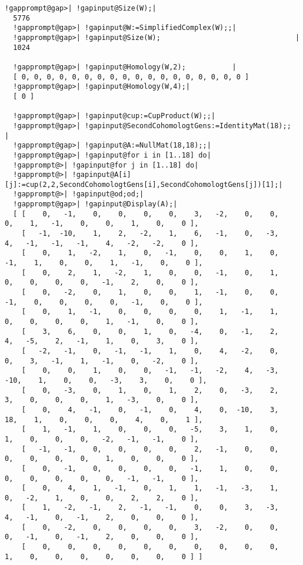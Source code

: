 \documentclass[a4paper,11pt]{report}
\begin{document}
{{\begin{Verbatim}[commandchars=!@|,fontsize=\small,frame=single,label=Example]
  !gapprompt@gap>| !gapinput@Size(W);|
  5776
  !gapprompt@gap>| !gapinput@W:=SimplifiedComplex(W);;|
  !gapprompt@gap>| !gapinput@Size(W);                                |
  1024
  
  !gapprompt@gap>| !gapinput@Homology(W,2);           |
  [ 0, 0, 0, 0, 0, 0, 0, 0, 0, 0, 0, 0, 0, 0, 0, 0, 0, 0 ]
  !gapprompt@gap>| !gapinput@Homology(W,4);|
  [ 0 ]
  
  !gapprompt@gap>| !gapinput@cup:=CupProduct(W);;|
  !gapprompt@gap>| !gapinput@SecondCohomologtGens:=IdentityMat(18);;   |
  !gapprompt@gap>| !gapinput@A:=NullMat(18,18);;|
  !gapprompt@gap>| !gapinput@for i in [1..18] do|
  !gapprompt@>| !gapinput@for j in [1..18] do|
  !gapprompt@>| !gapinput@A[i][j]:=cup(2,2,SecondCohomologtGens[i],SecondCohomologtGens[j])[1];|
  !gapprompt@>| !gapinput@od;od;|
  !gapprompt@gap>| !gapinput@Display(A);|
  [ [    0,   -1,    0,    0,    0,    0,    3,   -2,    0,    0,    0,    1,   -1,    0,    0,    1,    0,    0 ],
    [   -1,  -10,    1,    2,   -2,    1,    6,   -1,    0,   -3,    4,   -1,   -1,   -1,    4,   -2,   -2,    0 ],
    [    0,    1,   -2,    1,    0,   -1,    0,    0,    1,    0,   -1,    1,    0,    0,    1,   -1,    0,    0 ],
    [    0,    2,    1,   -2,    1,    0,    0,   -1,    0,    1,    0,    0,    0,    0,   -1,    2,    0,    0 ],
    [    0,   -2,    0,    1,    0,    0,    1,   -1,    0,    0,   -1,    0,    0,    0,    0,   -1,    0,    0 ],
    [    0,    1,   -1,    0,    0,    0,    0,    1,   -1,    1,    0,    0,    0,    0,    1,   -1,    0,    0 ],
    [    3,    6,    0,    0,    1,    0,   -4,    0,   -1,    2,    4,   -5,    2,   -1,    1,    0,    3,    0 ],
    [   -2,   -1,    0,   -1,   -1,    1,    0,    4,   -2,    0,    0,    3,   -1,    1,   -1,    0,   -2,    0 ],
    [    0,    0,    1,    0,    0,   -1,   -1,   -2,    4,   -3,  -10,    1,    0,    0,   -3,    3,    0,    0 ],
    [    0,   -3,    0,    1,    0,    1,    2,    0,   -3,    2,    3,    0,    0,    0,    1,   -3,    0,    0 ],
    [    0,    4,   -1,    0,   -1,    0,    4,    0,  -10,    3,   18,    1,    0,    0,    0,    4,    0,    1 ],
    [    1,   -1,    1,    0,    0,    0,   -5,    3,    1,    0,    1,    0,    0,    0,   -2,   -1,   -1,    0 ],
    [   -1,   -1,    0,    0,    0,    0,    2,   -1,    0,    0,    0,    0,    0,    0,    1,    0,    0,    0 ],
    [    0,   -1,    0,    0,    0,    0,   -1,    1,    0,    0,    0,    0,    0,    0,    0,   -1,   -1,    0 ],
    [    0,    4,    1,   -1,    0,    1,    1,   -1,   -3,    1,    0,   -2,    1,    0,    0,    2,    2,    0 ],
    [    1,   -2,   -1,    2,   -1,   -1,    0,    0,    3,   -3,    4,   -1,    0,   -1,    2,    0,    0,    0 ],
    [    0,   -2,    0,    0,    0,    0,    3,   -2,    0,    0,    0,   -1,    0,   -1,    2,    0,    0,    0 ],
    [    0,    0,    0,    0,    0,    0,    0,    0,    0,    0,    1,    0,    0,    0,    0,    0,    0,    0 ] ]
  

\end{Verbatim}}}
\end{document}
